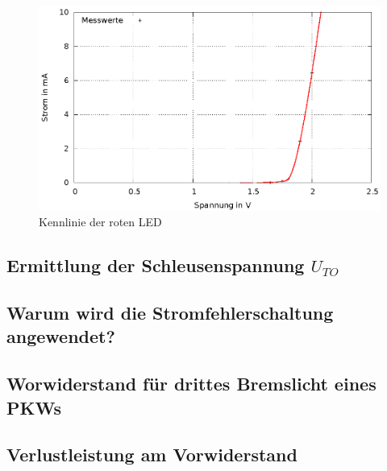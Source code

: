 \documentclass[
a4paper,     %
 headsepline, %
11pt         %
]{scrartcl}  %
\begin{document}
\begin{figure}[hbtp]
\centering
\includegraphics[scale=1]{kennlinie_led.eps}
\caption{Kennlinie der roten LED}
\end{figure}
\newpage

\subsection{Ermittlung der Schleusenspannung $U_{TO}$}


\subsection{Warum wird die Stromfehlerschaltung angewendet?}

\subsection{Worwiderstand für drittes Bremslicht eines PKWs}

\subsection{Verlustleistung am Vorwiderstand}



% 

% 
\end{document}
